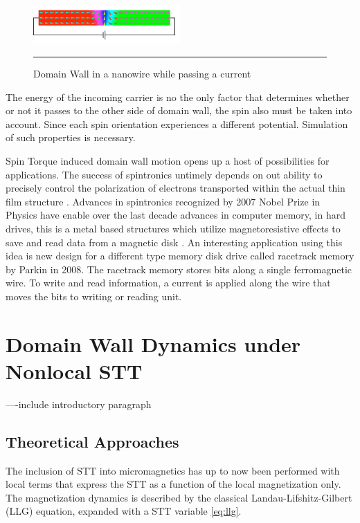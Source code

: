 \begin{figure}[htbp]
	\centering
		\includegraphics[width=0.5\textwidth]{Figures/DWspin.png}
		\rule{35em}{0.5pt}
	\caption[Domain Wall nanowire]{Domain Wall in a nanowire while passing a current}
	\label{fig:DWspin}
\end{figure}

The energy of the incoming  carrier is no the only factor that determines whether or not it passes to the other side of domain wall, the spin also must be taken into account. Since each spin orientation experiences a different potential. Simulation of such properties is necessary.

Spin Torque induced domain wall motion opens up a host of possibilities for applications. The success of spintronics untimely depends on out ability to precisely  control the polarization of electrons transported within the actual thin film structure \cite{ferro}. Advances in spintronics recognized by 2007 Nobel Prize in Physics have enable over the last decade advances in computer memory, in hard drives, this is a metal based structures which utilize magnetoresistive effects to save and read data from a magnetic disk \cite{handbookspin}. An interesting application using this idea is new design for a different type memory disk drive called racetrack memory by Parkin in 2008\cite{racetrack}. The racetrack memory stores bits along a single ferromagnetic wire. To write and read information, a current is applied along the wire that moves the bits to writing or reading unit.
 
\section{Domain Wall Dynamics under Nonlocal STT}

----include introductory paragraph 

\subsection{Theoretical Approaches}

The inclusion of STT into micromagnetics has up to now been performed with local terms that express the STT as a function of the local magnetization only. The magnetization dynamics is described by the classical Landau-Lifshitz-Gilbert (LLG) equation, expanded with a STT variable \ref{eq:llg}.

